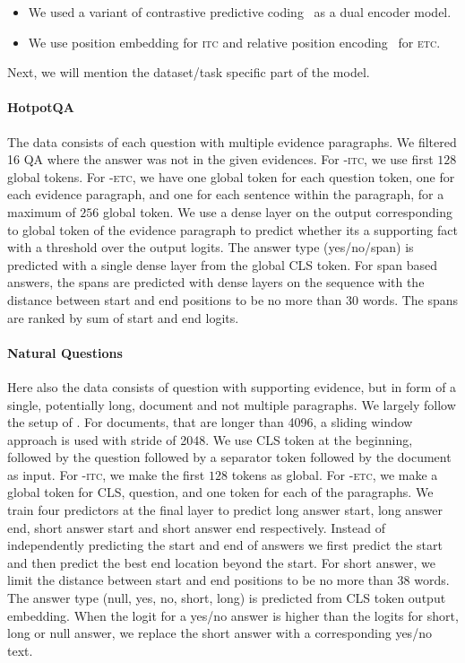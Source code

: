 \begin{itemize}[leftmargin=12mm, itemsep=0mm, partopsep=0pt,parsep=0pt]
    \item We used a variant of contrastive predictive coding~\citep{oord2018representation} as a dual encoder model.
    \item We use position embedding for \textsc{itc} and relative position encoding~\citep{shaw2018self} for \textsc{etc}.
\end{itemize}


Next, we will mention the dataset/task specific part of the model.

\paragraph{HotpotQA}
The data consists of each question with multiple evidence paragraphs. 
We filtered 16 QA where the answer was not in the given  evidences. 
For \bigb-\textsc{itc}, we use first $128$ global tokens. 
For \bigb-\textsc{etc}, we have one global token for each question token, one for each evidence paragraph, and one for each sentence within the paragraph, for a maximum of $256$ global token.
We use a dense layer on the output corresponding to global token of the evidence paragraph to predict whether its a supporting fact with a threshold over the output logits.
The answer type (yes/no/span) is predicted with a single dense layer from the global CLS token.
For span based answers, the spans are predicted with dense layers on the sequence with the distance between start and end positions to be no more than 30 words. 
The spans are ranked by sum of start and end logits.


\paragraph{Natural Questions}
Here also the data consists of question with supporting evidence, but in form of a single, potentially long, document and not multiple paragraphs. 
We largely follow the setup of \citep{alberti2019bert}.
For documents, that are longer than
4096, a sliding window approach is used
with stride of 2048.
We use CLS token at the beginning, followed by the question followed by a separator token followed by the document as input.
For \bigb-\textsc{itc}, we make the first $128$ tokens as global. For \bigb-\textsc{etc}, we make a global token for CLS, question, and one token for each of the paragraphs.
We train four predictors at the final layer to predict long answer start, long answer end, short answer start and short answer end respectively.
Instead of independently predicting the start and end of answers we first predict the start and then predict the best end location beyond the start.
For short answer, we limit the distance between start and end positions to be no more than 38 words.
The answer type (null, yes, no, short, long) is predicted from CLS token output embedding.
When the logit for a yes/no answer is higher than the logits for short, long or null answer, we replace the short answer with a corresponding yes/no text.

